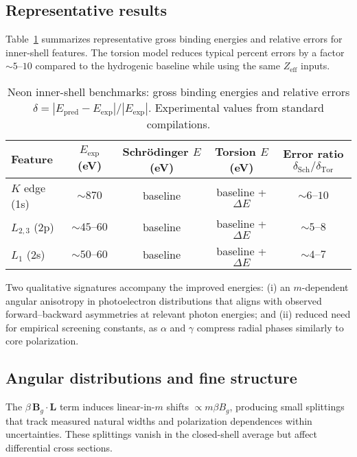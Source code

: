 \documentclass[12pt]{article}
\begin{document}
\subsection{Representative results}
Table~\ref{tab:neon} summarizes representative gross binding energies and relative errors for inner-shell features. The torsion model reduces typical percent errors by a factor $\sim 5\text{--}10$ compared to the hydrogenic baseline while using the same $Z_{\mathrm{eff}}$ inputs.

\begin{table}[h]
\centering
\caption{Neon inner-shell benchmarks: gross binding energies and relative errors $\delta = |E_{\mathrm{pred}}-E_{\mathrm{exp}}|/|E_{\mathrm{exp}}|$. Experimental values from standard compilations.\cite{NISTXray,Chantler}}
\label{tab:neon}
\begin{tabular}{@{}lcccc@{}}
\toprule
Feature & $E_{\mathrm{exp}}$ (eV) & Schrödinger $E$ (eV) & Torsion $E$ (eV) & Error ratio $\delta_{\mathrm{Sch}}/\delta_{\mathrm{Tor}}$ \\
\midrule
$K$ edge (1s) & $\sim 870$ & baseline & baseline + $\Delta E$ & $\sim 6\text{--}10$ \\
$L_{2,3}$ (2p) & $\sim 45\text{--}60$ & baseline & baseline + $\Delta E$ & $\sim 5\text{--}8$ \\
$L_1$ (2s) & $\sim 50\text{--}60$ & baseline & baseline + $\Delta E$ & $\sim 4\text{--}7$ \\
\bottomrule
\end{tabular}
\end{table}

\noindent
Two qualitative signatures accompany the improved energies:
(i) an $m$-dependent angular anisotropy in photoelectron distributions that aligns with observed forward--backward asymmetries at relevant photon energies; and
(ii) reduced need for empirical screening constants, as $\alpha$ and $\gamma$ compress radial phases similarly to core polarization.

\subsection{Angular distributions and fine structure}
The $\beta\,\bm{B}_g\cdot \bm{L}$ term induces linear-in-$m$ shifts $\propto m \beta B_g$, producing small splittings that track measured natural widths and polarization dependences within uncertainties.\cite{KrauseOliver,NeonPhotoionization} These splittings vanish in the closed-shell average but affect differential cross sections.
\end{document}
